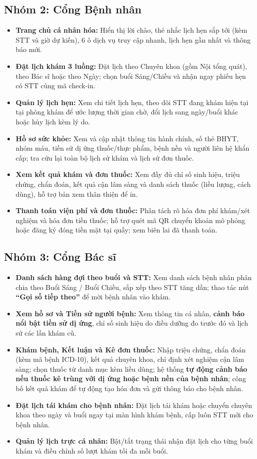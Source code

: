 \documentclass[12pt,a4paper]{report}
\begin{document}
\subsection{Nhóm 2: Cổng Bệnh nhân}
\begin{itemize}
  \item \textbf{Trang chủ cá nhân hóa:} Hiển thị lời chào, thẻ nhắc lịch hẹn sắp tới (kèm STT và giờ dự kiến), 6 ô dịch vụ truy cập nhanh, lịch hẹn gần nhất và thông báo mới.
  \item \textbf{Đặt lịch khám 3 luồng:} Đặt lịch theo Chuyên khoa (gồm Nội tổng quát), theo Bác sĩ hoặc theo Ngày; chọn buổi Sáng/Chiều và nhận ngay phiếu hẹn có STT cùng mã check-in.
  \item \textbf{Quản lý lịch hẹn:} Xem chi tiết lịch hẹn, theo dõi STT đang khám hiện tại tại phòng khám để ước lượng thời gian chờ, đổi lịch sang ngày/buổi khác hoặc hủy lịch kèm lý do.
  \item \textbf{Hồ sơ sức khỏe:} Xem và cập nhật thông tin hành chính, số thẻ BHYT, nhóm máu, tiền sử dị ứng thuốc/thực phẩm, bệnh nền và người liên hệ khẩn cấp; tra cứu lại toàn bộ lịch sử khám và lịch sử đơn thuốc.
  \item \textbf{Xem kết quả khám và đơn thuốc:} Xem đầy đủ chỉ số sinh hiệu, triệu chứng, chẩn đoán, kết quả cận lâm sàng và danh sách thuốc (liều lượng, cách dùng), hỗ trợ bản xem thân thiện để in.
  \item \textbf{Thanh toán viện phí và đơn thuốc:} Phân tách rõ hóa đơn phí khám/xét nghiệm và hóa đơn tiền thuốc; hỗ trợ quét mã QR chuyển khoản mô phỏng hoặc đăng ký đóng tiền mặt tại quầy; xem biên lai đã thanh toán.
\end{itemize}

\subsection{Nhóm 3: Cổng Bác sĩ}
\begin{itemize}
  \item \textbf{Danh sách hàng đợi theo buổi và STT:} Xem danh sách bệnh nhân phân chia theo Buổi Sáng / Buổi Chiều, sắp xếp theo STT tăng dần; thao tác nút \textbf{``Gọi số tiếp theo''} để mời bệnh nhân vào khám.
  \item \textbf{Xem hồ sơ và Tiền sử người bệnh:} Xem thông tin cá nhân, \textbf{cảnh báo nổi bật tiền sử dị ứng}, chỉ số sinh hiệu do điều dưỡng đo trước đó và lịch sử các lần khám cũ.
  \item \textbf{Khám bệnh, Kết luận và Kê đơn thuốc:} Nhập triệu chứng, chẩn đoán (kèm mã bệnh ICD-10), kết quả chuyên khoa, chỉ định xét nghiệm cận lâm sàng; chọn thuốc từ danh mục kèm liều dùng; hệ thống \textbf{tự động cảnh báo nếu thuốc kê trùng với dị ứng hoặc bệnh nền của bệnh nhân}; công bố kết quả khám để tự động tạo hóa đơn và gửi thông báo cho bệnh nhân.
  \item \textbf{Đặt lịch tái khám cho bệnh nhân:} Đặt lịch tái khám hoặc chuyển chuyên khoa theo ngày và buổi ngay tại màn hình khám bệnh, cấp luôn STT mới cho bệnh nhân.
  \item \textbf{Quản lý lịch trực cá nhân:} Bật/tắt trạng thái nhận đặt lịch cho từng buổi khám và điều chỉnh số lượt khám tối đa mỗi buổi.
\end{itemize}
\end{document}
